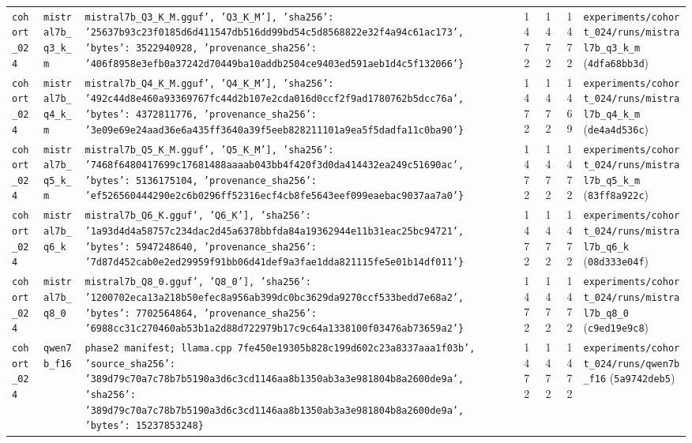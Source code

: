 {\begin{longtable}{@{}>{\raggedright\arraybackslash}p{1.5cm}>{\raggedright\arraybackslash}p{2.7cm}>{\raggedright\arraybackslash}p{3.2cm}rrr>{\raggedright\arraybackslash}p{4.2cm}@{}}
\texttt{cohort\_024} & \texttt{mistral7b\_q3\_k\_m} & \texttt{mistral7b\_Q3\_K\_M.gguf', 'Q3\_K\_M'], 'sha256': '25637b93c23f0185d6d411547db516dd99bd54c5d8568822e32f4a94c61ac173', 'bytes': 3522940928, 'provenance\_sha256': '406f8958e3efb0a37242d70449ba10addb2504ce9403ed591aeb1d4c5f132066'\}} & 1472 & 1472 & 1472 & \texttt{experiments/\allowbreak{}cohort\_024/\allowbreak{}runs/\allowbreak{}mistral7b\_q3\_k\_m} (\texttt{4dfa68bb3d}) \\
\texttt{cohort\_024} & \texttt{mistral7b\_q4\_k\_m} & \texttt{mistral7b\_Q4\_K\_M.gguf', 'Q4\_K\_M'], 'sha256': '492c44d8e460a93369767fc44d2b107e2cda016d0ccf2f9ad1780762b5dcc76a', 'bytes': 4372811776, 'provenance\_sha256': '3e09e69e24aad36e6a435ff3640a39f5eeb828211101a9ea5f5dadfa11c0ba90'\}} & 1472 & 1472 & 1469 & \texttt{experiments/\allowbreak{}cohort\_024/\allowbreak{}runs/\allowbreak{}mistral7b\_q4\_k\_m} (\texttt{de4a4d536c}) \\
\texttt{cohort\_024} & \texttt{mistral7b\_q5\_k\_m} & \texttt{mistral7b\_Q5\_K\_M.gguf', 'Q5\_K\_M'], 'sha256': '7468f6480417699c17681488aaaab043bb4f420f3d0da414432ea249c51690ac', 'bytes': 5136175104, 'provenance\_sha256': 'ef526560444290e2c6b0296ff52316ecf4cb8fe5643eef099eaebac9037aa7a0'\}} & 1472 & 1472 & 1472 & \texttt{experiments/\allowbreak{}cohort\_024/\allowbreak{}runs/\allowbreak{}mistral7b\_q5\_k\_m} (\texttt{83ff8a922c}) \\
\texttt{cohort\_024} & \texttt{mistral7b\_q6\_k} & \texttt{mistral7b\_Q6\_K.gguf', 'Q6\_K'], 'sha256': '1a93d4d4a58757c234dac2d45a6378bbfda84a19362944e11b31eac25bc94721', 'bytes': 5947248640, 'provenance\_sha256': '7d87d452cab0e2ed29959f91bb06d41def9a3fae1dda821115fe5e01b14df011'\}} & 1472 & 1472 & 1472 & \texttt{experiments/\allowbreak{}cohort\_024/\allowbreak{}runs/\allowbreak{}mistral7b\_q6\_k} (\texttt{08d333e04f}) \\
\texttt{cohort\_024} & \texttt{mistral7b\_q8\_0} & \texttt{mistral7b\_Q8\_0.gguf', 'Q8\_0'], 'sha256': '1200702eca13a218b50efec8a956ab399dc0bc3629da9270ccf533bedd7e68a2', 'bytes': 7702564864, 'provenance\_sha256': '6988cc31c270460ab53b1a2d88d722979b17c9c64a1338100f03476ab73659a2'\}} & 1472 & 1472 & 1472 & \texttt{experiments/\allowbreak{}cohort\_024/\allowbreak{}runs/\allowbreak{}mistral7b\_q8\_0} (\texttt{c9ed19e9c8}) \\
\texttt{cohort\_024} & \texttt{qwen7b\_f16} & \texttt{phase2 manifest; llama.cpp 7fe450e19305b828c199d602c23a8337aaa1f03b', 'source\_sha256': '389d79c70a7c78b7b5190a3d6c3cd1146aa8b1350ab3a3e981804b8a2600de9a', 'sha256': '389d79c70a7c78b7b5190a3d6c3cd1146aa8b1350ab3a3e981804b8a2600de9a', 'bytes': 15237853248\}} & 1472 & 1472 & 1472 & \texttt{experiments/\allowbreak{}cohort\_024/\allowbreak{}runs/\allowbreak{}qwen7b\_f16} (\texttt{5a9742deb5}) \\

\end{longtable}}
